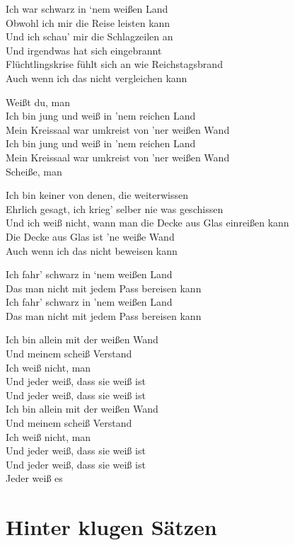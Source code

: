 \documentclass[]{book}
\begin{document}
Ich war schwarz in `nem weißen Land\\
Obwohl ich mir die Reise leisten kann\\
Und ich schau' mir die Schlagzeilen an\\
Und irgendwas hat sich eingebrannt\\
Flüchtlingskrise fühlt sich an wie Reichstagsbrand\\
Auch wenn ich das nicht vergleichen kann

Weißt du, man\\
Ich bin jung und weiß in 'nem reichen Land\\
Mein Kreissaal war umkreist von 'ner weißen Wand\\
Ich bin jung und weiß in 'nem reichen Land\\
Mein Kreissaal war umkreist von 'ner weißen Wand\\
Scheiße, man

Ich bin keiner von denen, die weiterwissen\\
Ehrlich gesagt, ich krieg' selber nie was geschissen\\
Und ich weiß nicht, wann man die Decke aus Glas einreißen kann\\
Die Decke aus Glas ist 'ne weiße Wand\\
Auch wenn ich das nicht beweisen kann

Ich fahr' schwarz in `nem weißen Land\\
Das man nicht mit jedem Pass bereisen kann\\
Ich fahr' schwarz in 'nem weißen Land\\
Das man nicht mit jedem Pass bereisen kann

Ich bin allein mit der weißen Wand\\
Und meinem scheiß Verstand\\
Ich weiß nicht, man\\
Und jeder weiß, dass sie weiß ist\\
Und jeder weiß, dass sie weiß ist\\
Ich bin allein mit der weißen Wand\\
Und meinem scheiß Verstand\\
Ich weiß nicht, man\\
Und jeder weiß, dass sie weiß ist\\
Und jeder weiß, dass sie weiß ist\\
Jeder weiß es

\hypertarget{hinter-klugen-satzen}{%
\section{Hinter klugen Sätzen}\label{hinter-klugen-satzen}}
\end{document}
